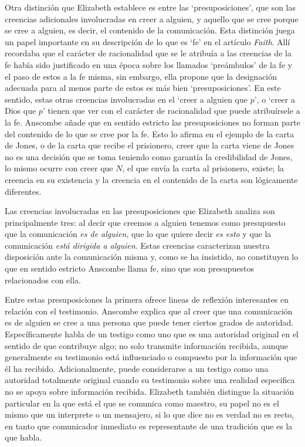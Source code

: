 Otra distinción que Elizabeth establece es entre las `presuposiciones', que son las creencias adicionales involucradas en creer a alguien, y aquello que se cree porque se cree a alguien, es decir, el contenido de la comunicación. Esta distinción juega un papel importante en su descripción de lo que es `fe' en el artículo \emph{Faith}. Allí recordaba que el carácter de racionalidad que se le atribuía a las creencias de la fe había sido justificado en una época sobre los llamados `preámbulos' de la fe y el paso de estos a la fe misma, sin embargo, ella propone que la designación adecuada para al menos parte de estos es más bien `presuposiciones'. En este sentido, estas otras creencias involucradas en el `creer a alguien que $p$', o `creer a Dios que $p$' tienen que ver con el carácter de racionalidad que puede atribuírsele a la fe. Anscombe añade que en sentido estricto las presuposiciones no forman parte del contenido de lo que se cree por la fe. Esto lo afirma en el ejemplo de la carta de Jones, o de la carta que recibe el prisionero, creer que la carta viene de Jones no es una decisión que se toma teniendo como garantía la credibilidad de Jones, lo mismo ocurre con creer que $N$, el que envía la carta al prisionero, existe; la creencia en su existencia y la creencia en el contenido de la carta son lógicamente diferentes.

Las creencias involucradas en las presuposiciones que Elizabeth analiza son principalmente tres: al decir que creemos a alguien tenemos como presupuesto que la comunicación \emph{es de alguien}, que lo que quiere decir \emph{es esto} y que la comunicación \emph{está dirigida a alguien}. Estas creencias caracterizan nuestra disposición ante la comunicación misma y, como se ha insistido, no constituyen lo que en sentido estricto Anscombe llama fe, sino que son presupuestos relacionados con ella.

Entre estas presuposiciones la primera ofrece lineas de reflexión interesantes en relación con el testimonio. Anscombe explica que al creer que una comunicación es de alguien se cree a una persona que puede tener ciertos grados de autoridad. Específicamente habla de un testigo como uno que es una autoridad original en el sentido de que contribuye algo; no solo transmite información recibida, aunque generalmente su testimonio está influenciado o compuesto por la información que él ha recibido. Adicionalmente, puede considerarse a un testigo como una autoridad totalmente original cuando su testimonio sobre una realidad específica no se apoya sobre información recibida. Elizabeth también distingue la situación particular en la que está el que se comunica como maestro, su papel no es el mismo que un interprete o un mensajero, si lo que dice no es verdad no es recto, en tanto que comunicador inmediato es representante de una tradición que es la que habla.


